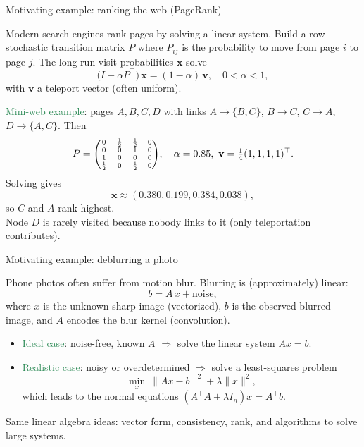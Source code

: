 \documentclass[11pt,aspectratio=169]{beamer}
\begin{document}
\begin{frame}{Motivating example: ranking the web (PageRank)}

Modern search engines rank pages by solving a linear system. Build a row-stochastic transition matrix \(P\) where \(P_{ij}\) is the probability to move from page \(i\) to page \(j\). The long-run visit probabilities \(\mathbf{x}\) solve
\[
\big(I-\alpha P^{\top}\big)\,\mathbf{x}=(1-\alpha)\,\mathbf{v},\quad 0<\alpha<1,
\]
with \(\mathbf{v}\) a teleport vector (often uniform).

\textcolor{SeaGreen}{Mini-web example}: pages \(A,B,C,D\) with links
\(A\to\{B,C\}\), \(B\to C\), \(C\to A\), \(D\to\{A,C\}\). Then
\[
{\scriptsize P=\begin{pmatrix}
0 & \tfrac12 & \tfrac12 & 0\\
0 & 0 & 1 & 0\\
1 & 0 & 0 & 0\\
\tfrac12 & 0 & \tfrac12 & 0
\end{pmatrix}},\quad
\alpha=0.85,\ \mathbf{v}=\tfrac14(1,1,1,1)^{\top}.
\]
Solving gives
\[
\mathbf{x}\approx (0.380,0.199,0.384,0.038),
\]
so \(C\) and \(A\) rank highest.\\[2mm] Node \(D\) is rarely visited because nobody links to it (only teleportation contributes).
\end{frame}

\begin{frame}{Motivating example: deblurring a photo}
\begin{small}
Phone photos often suffer from motion blur. Blurring is (approximately) linear:
\[
b=A\,x+\text{noise},
\]
where \(x\) is the unknown sharp image (vectorized), \(b\) is the observed blurred image, and \(A\) encodes the blur kernel (convolution).

\begin{itemize}
\item \textcolor{SeaGreen}{Ideal case}: noise-free, known \(A\) \(\Rightarrow\) solve the linear system \(A x=b\).
\item \textcolor{SeaGreen}{Realistic case}: noisy or overdetermined \(\Rightarrow\) solve a least-squares problem
\[
\min_{x}\ \|A x-b\|^2+\lambda\|x\|^2,
\]
which leads to the normal equations \((A^{\top}A+\lambda  I_n)x=A^{\top}b\).
\end{itemize}

Same linear algebra ideas: vector form, consistency, rank, and algorithms to solve large systems.
\end{small}
\end{frame}
\end{document}
